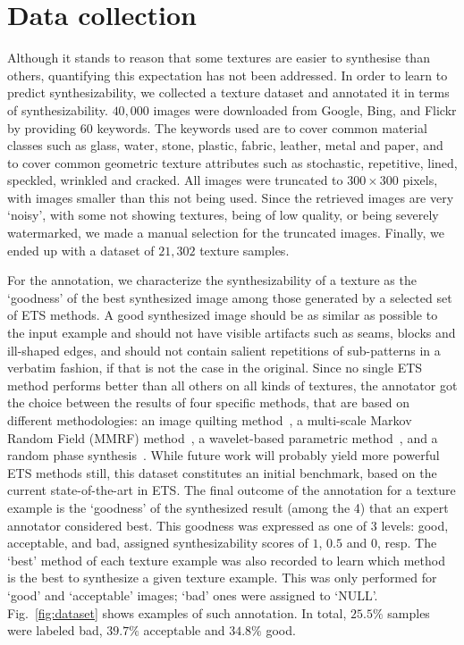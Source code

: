 
\section{Data collection}
\label{sec:data}
Although it stands to reason that some textures are easier to
synthesise than others, quantifying this expectation has not been
addressed. In order to learn to predict synthesizability, we collected
a texture dataset and annotated it in terms of
synthesizability. $40,000$ images were downloaded from Google, Bing,
and Flickr by providing $60$ keywords. The keywords used are to cover
common material classes such as glass, water, stone, plastic, fabric,
leather, metal and paper, and to cover common geometric texture
attributes such as stochastic, repetitive, lined, speckled, wrinkled
and cracked. All images were truncated to $300 \times 300$ pixels,
with images smaller than this not being used. Since the retrieved
images are very `noisy', with some not showing textures, being of low
quality, or being severely watermarked, we made a manual selection for
the truncated images. Finally, we ended up with a dataset of $21,302$
texture samples.

For the annotation, we characterize the synthesizability of a texture
as the `goodness' of the best synthesized image among those generated
by a selected set of ETS methods. A good synthesized image should be
as similar as possible to the input example and should not have
visible artifacts such as seams, blocks and ill-shaped edges, and
should not contain salient repetitions of sub-patterns in a verbatim
fashion, if that is not the case in the original. Since no single ETS
method performs better than all others on all kinds of textures, the
annotator got the choice between the results of four specific methods,
that are based on different methodologies: an image quilting
method~\citep{Efros:sig2001}, a multi-scale Markov Random Field (MMRF)
method~\citep{Zalesny05}, a wavelet-based parametric
method~\citep{Portilla:2000:IJCV}, and a random phase
synthesis~\citep{random:phase}. While future work will probably yield
more powerful ETS methods still, this dataset constitutes an initial
benchmark, based on the current state-of-the-art in ETS. The final
outcome of the annotation for a texture example is the `goodness' of
the synthesized result (among the 4) that an expert annotator
considered best. This goodness was expressed as one of 3 levels: good,
acceptable, and bad, assigned synthesizability scores of $1$, $0.5$
and $0$, resp. The `best' method of each texture example was also
recorded to learn which method is the best to synthesize a given
texture example. This was only performed for `good' and `acceptable'
images; `bad' ones were assigned to `NULL'.  Fig.~\ref{fig:dataset}
shows examples of such annotation. In total, $25.5\%$ samples were
labeled bad, $39.7\%$ acceptable and $34.8\%$ good.

